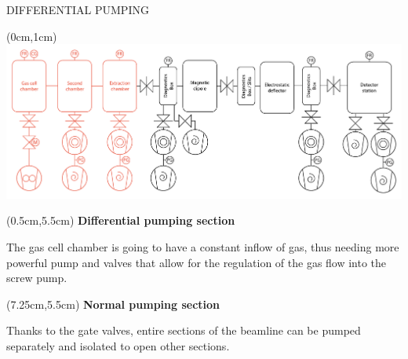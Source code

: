 \documentclass[9pt]{beamer}
\begin{document}
\begin{frame}{DIFFERENTIAL PUMPING}
    \begin{textblock*}{13cm}(0cm,1cm)
            \centering
            \includegraphics[scale=0.35]{assets/pumpdia2.pdf}
    \end{textblock*}
        
    \begin{textblock*}{5cm}(0.5cm,5.5cm)
      \centering
      \vspace{1em}
      \textbf{\color[RGB]{233,74,53} Differential pumping section} 
      
      {\color[RGB]{233,74,53} The gas cell chamber is going to have a constant inflow of gas, thus needing more powerful pump and valves that allow for the regulation of the gas flow into the screw pump.}
    \end{textblock*}
        
    \begin{textblock*}{5cm}(7.25cm,5.5cm)
        \centering
        \vspace{1em}
        \textbf{Normal pumping section} 
      
      {Thanks to the gate valves, entire sections of the beamline can be pumped separately and isolated to open other sections.}
    \end{textblock*}
\end{frame}
\end{document}
